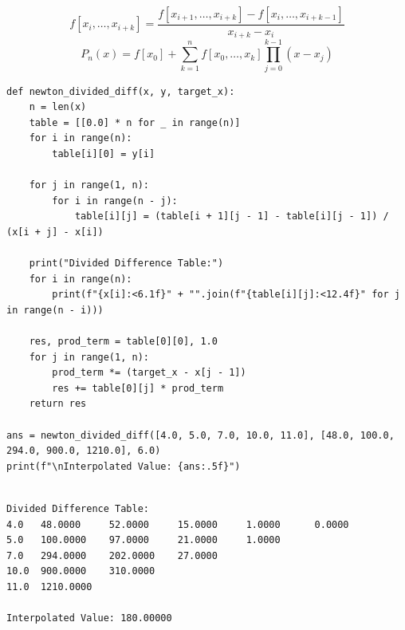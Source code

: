 \documentclass[10pt,a4paper]{report}
\begin{document}
\begin{tcolorbox}[colback=theorybg,colframe=theoryframe,title=\textbf{Mathematical Theory \& Formulation},boxrule=1pt,arc=2mm]
\[
f[x_i, \dots, x_{i+k}] = \frac{f[x_{i+1}, \dots, x_{i+k}] - f[x_i, \dots, x_{i+k-1}]}{x_{i+k} - x_i}
\]
\[
P_n(x) = f[x_0] + \sum_{k=1}^n f[x_0, \dots, x_k] \prod_{j=0}^{k-1} (x - x_j)
\]
\end{tcolorbox}

\begin{tcolorbox}[colback=codebg,colframe=secondary,title=\textbf{Python Implementation (Step-by-Step Functions)},boxrule=1pt,arc=2mm]
\begin{lstlisting}[style=python_detailed]
def newton_divided_diff(x, y, target_x):
    n = len(x)
    table = [[0.0] * n for _ in range(n)]
    for i in range(n):
        table[i][0] = y[i]

    for j in range(1, n):
        for i in range(n - j):
            table[i][j] = (table[i + 1][j - 1] - table[i][j - 1]) / (x[i + j] - x[i])

    print("Divided Difference Table:")
    for i in range(n):
        print(f"{x[i]:<6.1f}" + "".join(f"{table[i][j]:<12.4f}" for j in range(n - i)))

    res, prod_term = table[0][0], 1.0
    for j in range(1, n):
        prod_term *= (target_x - x[j - 1])
        res += table[0][j] * prod_term
    return res

ans = newton_divided_diff([4.0, 5.0, 7.0, 10.0, 11.0], [48.0, 100.0, 294.0, 900.0, 1210.0], 6.0)
print(f"\nInterpolated Value: {ans:.5f}")


\end{lstlisting}
\end{tcolorbox}

\begin{tcolorbox}[colback=termbg,colframe=primary,title=\textbf{Program Execution Output \& Convergence Table},boxrule=1pt,arc=2mm]
\begin{lstlisting}[style=terminal_output]
Divided Difference Table:
4.0   48.0000     52.0000     15.0000     1.0000      0.0000      
5.0   100.0000    97.0000     21.0000     1.0000      
7.0   294.0000    202.0000    27.0000     
10.0  900.0000    310.0000    
11.0  1210.0000   

Interpolated Value: 180.00000
\end{lstlisting}
\end{tcolorbox}

\newpage

\end{document}
